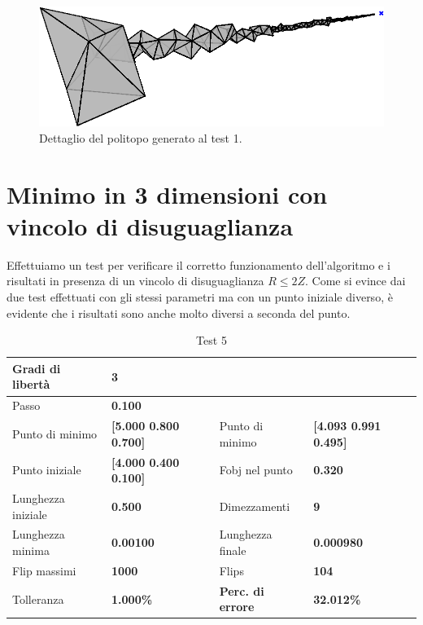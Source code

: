 \documentclass[a4paper, 11pt]{article}
\begin{document}
\begin{figure}[H]
	\centering
		\includegraphics[width=14cm]{assets/figure6}
		\caption{Dettaglio del politopo generato al test 1.}
\end{figure}
\noindent

\newpage
\section{Minimo in 3 dimensioni con vincolo di disuguaglianza}

Effettuiamo un test per verificare il corretto funzionamento dell'algoritmo e i
risultati in presenza di un vincolo di disuguaglianza $R \le 2Z$. Come si evince
dai due test effettuati con gli stessi parametri ma con un punto iniziale
diverso, è evidente che i risultati sono anche molto diversi a seconda del punto.

\begin{table}[h]
	\caption{Test 5}
	\begin{center}
	\begin{tabular}{|l|l|l|l|} 
	\hline 
	Gradi di libertà & \textbf{3} &  &  \\ \hline 
	Passo & \textbf{0.100} &  &  \\ \hline 
	Punto di minimo & \textbf{{[}5.000 0.800 0.700{]}} & Punto di minimo & \textbf{{[}4.093 0.991 0.495{]}} \\ \hline 
	Punto iniziale & \textbf{{[}4.000 0.400 0.100{]}} & Fobj nel punto & \textbf{0.320} \\ \hline 
	Lunghezza iniziale & \textbf{0.500} & Dimezzamenti & \textbf{9} \\ \hline 
	Lunghezza minima & \textbf{0.00100} & Lunghezza finale & \textbf{0.000980} \\ \hline
	Flip massimi & \textbf{1000} & Flips & \textbf{104} \\ \hline 
	Tolleranza & \textbf{1.000\%} & \textbf{Perc. di errore} & \textbf{32.012\%} \\ \hline 
	\end{tabular} 
	\end{center}
	\end{table}
\end{document}
